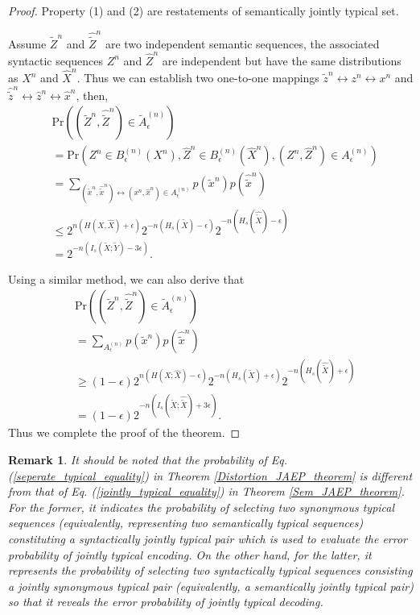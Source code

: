 \documentclass[12pt, draftclsnofoot,onecolumn]{IEEEtran}
\newtheorem{remark}{\bf{Remark}}
\begin{document}
\begin{proof}
Property (1) and (2) are restatements of semantically jointly typical set.

Assume $\tilde{Z}^n$ and $\hat{\tilde{Z}}^n$ are two independent semantic sequences, the associated syntactic sequences $Z^n$ and $\hat{Z}^n$ are independent but have the same distributions as $X^n$ and $\hat{X}^n$. Thus we can establish two one-to-one mappings ${\tilde{z}}^n \leftrightarrow z^n \leftrightarrow x^n$ and $\hat{\tilde{z}}^n \leftrightarrow \hat{z}^n \leftrightarrow \hat{x}^n$, then,
\begin{equation}
\begin{aligned}
&\text{Pr}\left((\tilde{Z}^n,\hat{\tilde{Z}}^n)\in {\tilde{A}}_{\epsilon}^{(n)}\right) \\
&=\text{Pr}\left(Z^n\in B_{\epsilon}^{(n)}(X^n),\hat{Z}^n\in B_{\epsilon}^{(n)}(\hat{X}^n), (Z^n,\hat{Z}^n)\in {A}_{\epsilon}^{(n)}\right) \\
&= \sum_{ (\tilde{x}^n,\hat{\tilde{x}}^n) \leftrightarrow ({x}^n,\hat{x}^n)\in {A}_{\epsilon}^{(n)}} p(\tilde{x}^n)p(\hat{\tilde{x}}^n)\\
&\leq 2^{n\left(H(X,\hat{X})+\epsilon\right)}2^{-n\left(H_s(\tilde{X})-\epsilon\right)}2^{-n\left(H_s(\hat{\tilde{X}})-\epsilon\right)}\\
&= 2^{-n\left(I_s(\tilde{X};\tilde{Y})-3\epsilon\right)}.
\end{aligned}
\end{equation}

Using a similar method, we can also derive that
\begin{equation}
\begin{aligned}
&\text{Pr}\left((\tilde{Z}^n,\hat{\tilde{Z}}^n)\in {\tilde{A}}_{\epsilon}^{(n)}\right) \\
&=\sum_{ {A}_{\epsilon}^{(n)}} p(\tilde{x}^n)p(\hat{\tilde{x}}^n)\\
&\geq  (1-\epsilon)2^{n(H(X;\hat{X})-\epsilon)}2^{-n\left(H_s(\tilde{X})+\epsilon\right)}2^{-n\left(H_s(\hat{\tilde{X}})+\epsilon\right)}\\
&= (1-\epsilon) 2^{-n\left(I_s(\tilde{X};\hat{\tilde{X}})+3\epsilon\right)}.
\end{aligned}
\end{equation}
Thus we complete the proof of the theorem.
\end{proof}

\begin{remark}
It should be noted that the probability of Eq. (\ref{seperate_typical_equality}) in Theorem \ref{Distortion_JAEP_theorem} is different from that of Eq. (\ref{jointly_typical_equality}) in Theorem \ref{Sem_JAEP_theorem}. For the former, it indicates the probability of selecting two synonymous typical sequences (equivalently, representing two semantically typical sequences) constituting a syntactically jointly typical pair which is used to evaluate the error probability of jointly typical encoding. On the other hand, for the latter, it represents the probability of selecting two syntactically typical sequences consisting a jointly synonymous typical pair (equivalently, a semantically jointly typical pair) so that it reveals the error probability of jointly typical decoding.
\end{remark}
\end{document}
